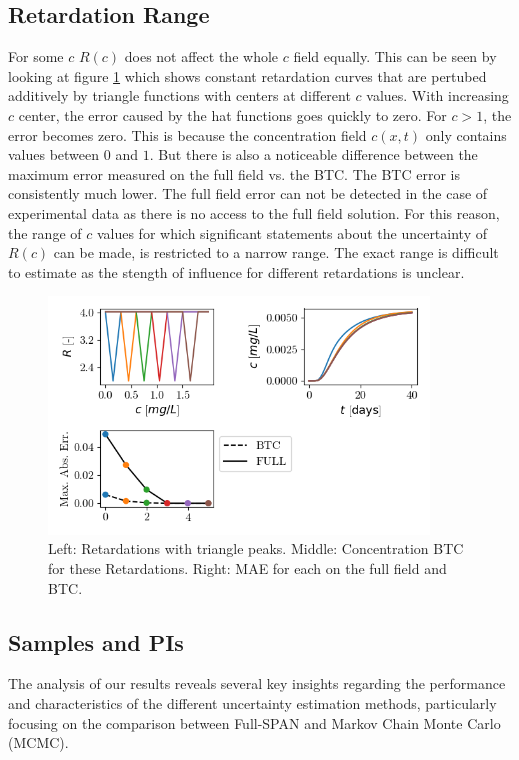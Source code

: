 \documentclass{article}
\begin{document}
\subsection{Retardation Range} %
For some $c$ $R(c)$ does not affect the whole $c$ field equally. This can be seen by looking at figure \ref{fig:triangle_ret_pertubation} which shows constant retardation curves that are pertubed additively by triangle functions with centers at different $c$ values. With increasing $c$ center, the error caused by the hat functions goes quickly to zero. For $c > 1$, the error becomes zero. This is because the concentration field $c(x,t)$ only contains values between $0$ and $1$. But there is also a noticeable difference between the maximum error measured on the full field vs. the BTC. The BTC error is consistently much lower.
The full field error can not be detected in the case of experimental data as there is no access to the full field solution. For this reason, the range of $c$ values for which significant statements about the uncertainty of $R(c)$ can be made, is restricted to a narrow range. The exact range is difficult to estimate as the stength of influence for different retardations is unclear.


\begin{figure}
    \centering
    \includegraphics[width=0.9\textwidth]{figs/triangle_ret_pertubation.png}
    \caption{Left: Retardations with triangle peaks. Middle: Concentration BTC for these Retardations. Right: MAE for each on the full field and BTC.}
    \label{fig:triangle_ret_pertubation}
\end{figure}


\subsection{Samples and PIs}
The analysis of our results reveals several key insights regarding the performance and characteristics of the different uncertainty estimation methods, particularly focusing on the comparison between Full-SPAN and Markov Chain Monte Carlo (MCMC).
\end{document}
